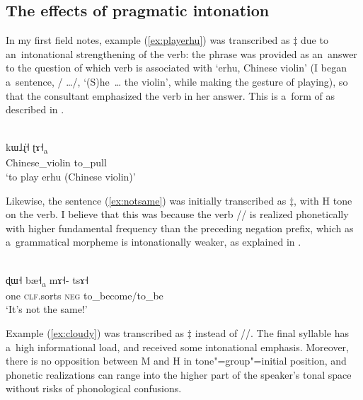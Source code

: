 \subsection{The effects of pragmatic intonation}
\label{sec:theeffectsofpragmaticintonation}

In my first field notes, example (\ref{ex:playerhu}) was transcribed as $\ddagger${\kern2pt} due to an~intonational strengthening of the verb: the phrase was
provided as an~answer to the {question} of which verb is associated with ‘erhu, Chinese violin’ (I
began a~sentence, / {\dots}/, ‘(S)he~{\dots} the violin’, while making the
gesture of playing), so that the consultant emphasized the verb in her answer. This is a~form of  as described in .

\begin{exe}
	\ex
	\label{ex:playerhu}
	\\ 
	\gll kɯ˩ɻ̍˧		ʈɤ˧\textsubscript{a}\\
	Chinese\_violin			to\_pull\\
	\glt ‘to play erhu (Chinese violin)’
\end{exe}

Likewise, the sentence (\ref{ex:notsame}) was initially transcribed as
$\ddagger${\kern2pt}, with H tone on the verb. I believe that this was because the verb
// is realized phonetically with higher fundamental frequency than the preceding
{negation} prefix, which as a~grammatical morpheme is intonationally weaker, as explained in .

\begin{exe}
	\ex
	\label{ex:notsame}
	\\ 
	\gll ɖɯ˧	bæ˧\textsubscript{a}	mɤ˧-	tsɤ˧\\
	one		\textsc{clf}.sorts	\textsc{neg}	to\_become/to\_be\\
	\glt ‘It’s not the same!’
\end{exe}

Example (\ref{ex:cloudy}) was transcribed as $\ddagger${\kern2pt} instead of //. The
final syllable has a~high informational load, and received some intonational emphasis. Moreover, there is no opposition between M and H in tone"=group"=initial position, and phonetic realizations can range into the higher part of the speaker's tonal space without risks of phonological confusions.

